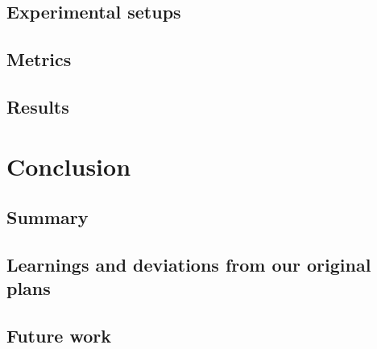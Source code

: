 \documentclass[a4paper,11pt,english]{article}
\begin{document}
\subsection{Experimental setups}
\subsection{Metrics}
\subsection{Results}

\section{Conclusion}

\subsection{Summary}
\subsection{Learnings and deviations from our original plans}
\subsection{Future work}
\end{document}
